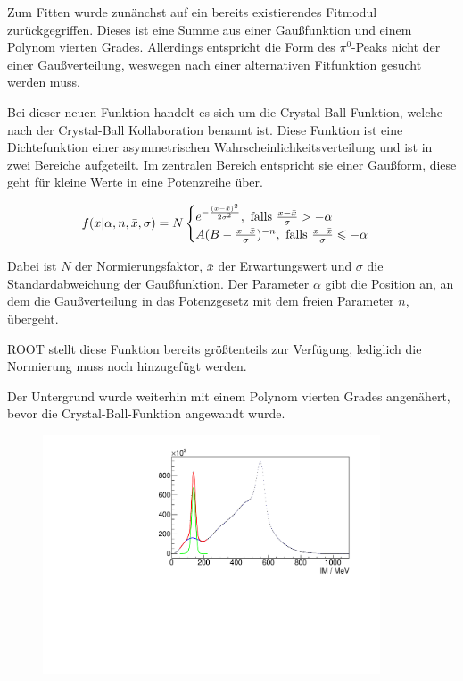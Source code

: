 \documentclass[a4paper,11pt,oneside,final,german,openbib,pdftex]{scrbook}
\begin{document}
{Zum Fitten wurde zun\"anchst auf ein bereits existierendes Fitmodul zur\"uckgegriffen. Dieses ist eine Summe aus einer Gau{\ss}funktion und einem Polynom vierten Grades. Allerdings entspricht die Form des $\pi^0$-Peaks nicht der einer Gau{\ss}verteilung, weswegen nach einer alternativen Fitfunktion gesucht werden muss. 

Bei dieser neuen Funktion handelt es sich um die Crystal-Ball-Funktion, welche nach der Crystal-Ball Kollaboration benannt ist. Diese Funktion ist eine Dichtefunktion einer asymmetrischen Wahrscheinlichkeitsverteilung und ist in zwei Bereiche aufgeteilt. Im zentralen Bereich entspricht sie einer Gau{\ss}form, diese geht f\"ur kleine Werte in eine Potenzreihe \"uber.

\begin{equation}
f(x|\alpha,n,\bar{x},\sigma)=N\begin{cases}e^{-\frac{(x-\bar{x})^2}{2\sigma^2}}, \textnormal{  falls $\frac{x-\bar{x}}{\sigma}> -\alpha$} \\
A(B-\frac{x-\bar{x}}{\sigma})^{-n}, \textnormal{  falls $\frac{x-\bar{x}}{\sigma}\leqslant -\alpha$} 
\end{cases}
\label{eq:Crystal-Ball-Funktion}
\end{equation}

Dabei ist $N$ der Normierungsfaktor, $\bar{x}$ der Erwartungswert und $\sigma$ die Standardabweichung der Gau{\ss}funktion. Der Parameter $\alpha$ gibt die Position an, an dem die Gau{\ss}verteilung in das Potenzgesetz mit dem freien Parameter $n$, \"ubergeht\cite{Ce15}.

ROOT stellt diese Funktion bereits gr\"o{\ss}tenteils zur Verf\"ugung, lediglich die Normierung muss noch hinzugef\"ugt werden.

Der Untergrund wurde weiterhin mit einem Polynom vierten Grades angen\"ahert, bevor die Crystal-Ball-Funktion angewandt wurde.

\begin{figure}[h!]
	\begin{center}
		\includegraphics[width=100mm]{NewCalib/Strahlzeit2014/20171904RealIntervalFitExample}
		

\end{center}
\end{figure}}
\end{document}
